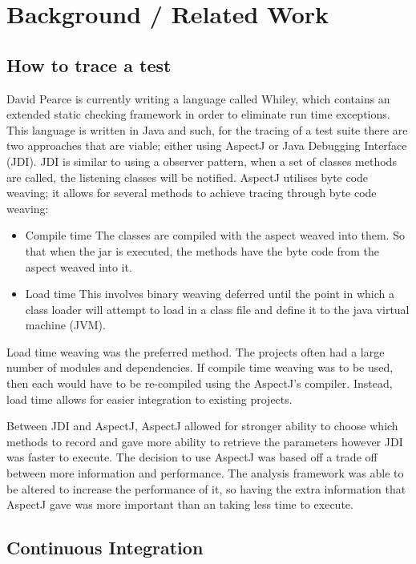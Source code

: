 \chapter{Background / Related Work}\label{C:related}

\section{How to trace a test}

David Pearce is currently writing a language called Whiley, which contains an extended static checking framework in order to eliminate run time exceptions. This language is written in Java and such, for the tracing of a test suite there are two approaches that are viable; either using AspectJ or Java Debugging Interface (JDI). JDI is similar to using a observer pattern, when a set of classes methods are called, the listening classes will be notified. AspectJ utilises byte code weaving; it allows for several methods to achieve tracing through byte code weaving:

\begin{itemize}
\item Compile time
The classes are compiled with the aspect weaved into them. So that when the jar is executed, the methods have the byte code from the aspect weaved into it.
\item Load time
This involves binary weaving deferred until the point in which a class loader will attempt to load in a class file and define it to the java virtual machine (JVM).
\end{itemize}

Load time weaving was the preferred method. The projects often had a large number of modules and dependencies. If compile time weaving was to be used, then each would have to be re-compiled using the AspectJ's compiler. Instead, load time allows for easier integration to existing projects.

Between JDI and AspectJ, AspectJ allowed for stronger ability to choose which methods to record and gave more ability to retrieve the parameters however JDI was faster to execute. The decision to use AspectJ was based off a trade off between more information and performance. The analysis framework was able to be altered to increase the performance of it, so having the extra information that AspectJ gave was more important than an taking less time to execute.

\section{Continuous Integration}


